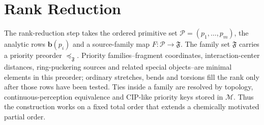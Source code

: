 \documentclass[journal=jctcce,manuscript=article,layout=traditional]{achemso}
\newcommand{\bmat}{\mathbf{b}}
\theoremstyle{definition}
\begin{document}
\section{Rank Reduction}

The rank-reduction step takes the ordered primitive set
\(\mathcal{P}=(p_1,\ldots,p_m)\), the analytic rows
\(\bmat(p_i)\) and a source-family map \(F:\mathcal{P}\to\mathfrak{F}\).
The family set \(\mathfrak{F}\) carries a priority preorder
\(\preceq_{\mathfrak{F}}\).  Priority families--fragment coordinates,
interaction-center distances, ring-puckering sources and related special
objects--are minimal elements in this preorder; ordinary stretches, bends and
torsions fill the rank only after those rows have been tested.  Ties inside
a family are resolved by topology, continuous-perception equivalence and
CIP-like priority keys stored in \(\mathcal{M}\).  Thus the construction works on a
fixed total order that extends a chemically motivated partial order.
\end{document}
